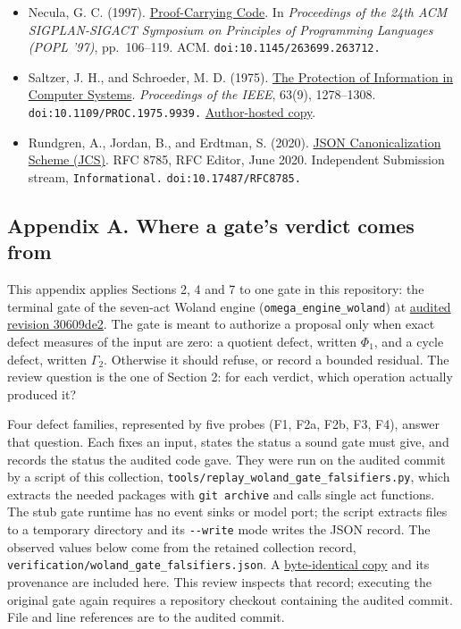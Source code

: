 \documentclass[
  11pt,
]{article}
\newcommand{\passthrough}[1]{#1}
\providecommand{\tightlist}{%
  \setlength{\itemsep}{0pt}\setlength{\parskip}{0pt}}
\begin{document}
\begin{itemize}
\tightlist
\item
  Necula, G. C. (1997).
  \href{https://doi.org/10.1145/263699.263712}{Proof-Carrying Code}. In
  \emph{Proceedings of the 24th ACM SIGPLAN-SIGACT Symposium on
  Principles of Programming Languages (POPL '97)}, pp.~106--119. ACM.
  \nolinkurl{doi:10.1145/263699.263712.}
\item
  Saltzer, J. H., and Schroeder, M. D. (1975).
  \href{https://doi.org/10.1109/PROC.1975.9939}{The Protection of
  Information in Computer Systems}. \emph{Proceedings of the IEEE},
  63(9), 1278--1308. \nolinkurl{doi:10.1109/PROC.1975.9939.}
  \href{https://web.mit.edu/Saltzer/www/publications/protection/}{Author-hosted
  copy}.
\item
  Rundgren, A., Jordan, B., and Erdtman, S. (2020).
  \href{https://www.rfc-editor.org/rfc/rfc8785}{JSON Canonicalization
  Scheme (JCS)}. RFC 8785, RFC Editor, June 2020. Independent Submission
  stream, \nolinkurl{Informational.} \nolinkurl{doi:10.17487/RFC8785.}
\end{itemize}

\subsection{Appendix A. Where a gate's verdict comes
from}\label{appendix-a.-where-a-gates-verdict-comes-from}

This appendix applies Sections 2, 4 and 7 to one gate in this
repository: the terminal gate of the seven-act Woland engine
(\nolinkurl{omega_engine_woland}) at
\href{https://github.com/dbccpage/the_symbol_game/commit/30609de2c3928238715375a9bac608256fa381d8}{audited
revision 30609de2}. The gate is meant to authorize a proposal only when
exact defect measures of the input are zero: a quotient defect, written
\(\Phi_1\), and a cycle defect, written \(\Gamma_2\). Otherwise it
should refuse, or record a bounded residual. The review question is the
one of Section 2: for each verdict, which operation actually produced
it?

Four defect families, represented by five probes (F1, F2a, F2b, F3, F4),
answer that question. Each fixes an input, states the status a sound
gate must give, and records the status the audited code gave. They were
run on the audited commit by a script of this collection,
\nolinkurl{tools/replay_woland_gate_falsifiers.py}, which extracts the
needed packages with \passthrough{\lstinline!git archive!} and calls
single act functions. The stub gate runtime has no event sinks or model
port; the script extracts files to a temporary directory and its
\passthrough{\lstinline!--write!} mode writes the JSON record. The
observed values below come from the retained collection record,
\nolinkurl{verification/woland_gate_falsifiers.json}. A
\href{docs/historical_evidence/woland_gate_falsifiers.json}{byte-identical
copy} and its provenance are included here. This review inspects that
record; executing the original gate again requires a repository checkout
containing the audited commit. File and line references are to the
audited commit.
\end{document}
